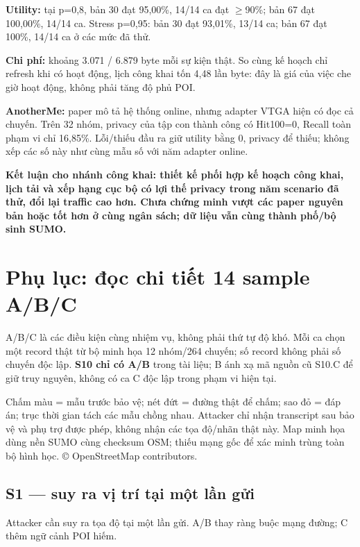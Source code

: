 \documentclass[10pt,a4paper]{article}
\newcommand{\key}[1]{\par\smallskip\noindent\colorbox{pale}{\parbox{\dimexpr\linewidth-2\fboxsep}{\textbf{#1}}}\par\smallskip}
\begin{document}
\textbf{Utility:} tại p=0,8, bản 30 đạt 95,00\%, 14/14 ca đạt $\ge$90\%; bản 67 đạt 100,00\%, 14/14 ca. Stress p=0,95: bản 30 đạt 93,01\%, 13/14 ca; bản 67 đạt 100\%, 14/14 ca ở các mức đã thử.

\textbf{Chi phí:} khoảng 3.071 / 6.879 byte mỗi sự kiện thật. So cùng kế hoạch chỉ refresh khi có hoạt động, lịch công khai tốn 4,48 lần byte: đây là giá của việc che giờ hoạt động, không phải tăng độ phủ POI.

\textbf{AnotherMe:} paper mô tả hệ thống online, nhưng adapter VTGA hiện có đọc cả chuyến. Trên 32 nhóm, privacy của tập con thành công có Hit100=0, Recall toàn phạm vi chỉ 16,85\%. Lỗi/thiếu đầu ra giữ utility bằng 0, privacy để thiếu; không xếp các số này như cùng mẫu số với năm adapter online.

\key{Kết luận cho nhánh công khai: thiết kế phối hợp kế hoạch công khai, lịch tải và xếp hạng cục bộ có lợi thế privacy trong năm scenario đã thử, đổi lại traffic cao hơn. Chưa chứng minh vượt các paper nguyên bản hoặc tốt hơn ở cùng ngân sách; dữ liệu vẫn cùng thành phố/bộ sinh SUMO.}


\clearpage
\section{Phụ lục: đọc chi tiết 14 sample A/B/C}\label{sec:4}
A/B/C là các điều kiện cùng nhiệm vụ, không phải thứ tự độ khó. Mỗi ca chọn một record thật từ bộ minh họa 12 nhóm/264 chuyến; số record không phải số chuyến độc lập. \textbf{S10 chỉ có A/B} trong tài liệu; B ánh xạ mã nguồn cũ S10.C để giữ truy nguyên, không có ca C độc lập trong phạm vi hiện tại.

Chấm màu = mẫu trước bảo vệ; nét đứt = đường thật để chấm; sao đỏ = đáp án; trục thời gian tách các mẫu chồng nhau. Attacker chỉ nhận transcript sau bảo vệ và phụ trợ được phép, không nhận các tọa độ/nhãn thật này. Map minh họa dùng nền SUMO cùng checksum OSM; thiếu mạng gốc để xác minh trùng toàn bộ hình học. © OpenStreetMap contributors.

\subsection{S1 — suy ra vị trí tại một lần gửi}\label{sub:4.1}
Attacker cần suy ra tọa độ tại một lần gửi. A/B thay ràng buộc mạng đường; C thêm ngữ cảnh POI hiếm.
\end{document}

